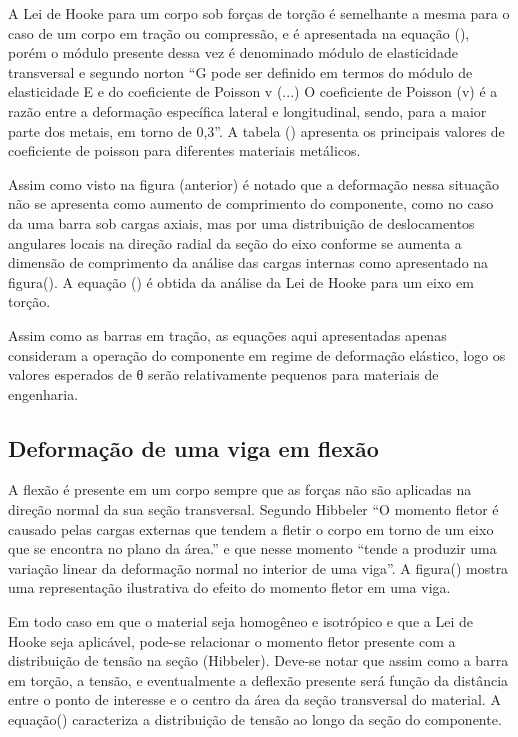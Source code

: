 A Lei de Hooke para um corpo sob forças de torção é semelhante a mesma para o caso de um corpo em tração ou compressão, e é apresentada na equação (), porém o módulo presente dessa vez é denominado módulo de elasticidade transversal e segundo norton “G pode ser definido em termos do módulo de elasticidade E e do coeficiente de Poisson v (...) O coeficiente de Poisson (v) é a razão entre a deformação específica lateral e longitudinal, sendo, para a maior parte dos metais, em torno de 0,3”. A tabela () apresenta os principais valores de coeficiente de poisson para diferentes materiais metálicos.

Assim como visto na figura (anterior) é notado que a deformação nessa situação não se apresenta como aumento de comprimento do componente, como no caso da uma barra sob cargas axiais, mas por uma distribuição de deslocamentos angulares locais na direção radial da seção do eixo conforme se aumenta a dimensão de comprimento da análise das cargas internas como apresentado na figura(). A equação () é obtida da análise da Lei de Hooke para um eixo em torção.

Assim como as barras em tração, as equações aqui apresentadas apenas consideram a operação do componente em regime de deformação elástico, logo os valores esperados de θ serão relativamente pequenos para materiais de engenharia.

\subsection{Deformação de uma viga em flexão}

A flexão é presente em um corpo sempre que as forças não são aplicadas na direção normal da sua seção transversal. Segundo Hibbeler “O momento fletor é causado pelas cargas externas que tendem a fletir o corpo em torno de um eixo que se encontra no plano da área.” e que nesse momento “tende a produzir uma variação linear da deformação normal no interior de uma viga”.  A  figura() mostra uma representação ilustrativa do efeito do momento fletor em uma viga.

Em todo caso em que o material seja homogêneo e isotrópico e que a Lei de Hooke seja aplicável, pode-se relacionar o momento fletor presente com a distribuição de tensão na seção (Hibbeler). Deve-se notar que assim como a barra em torção, a tensão, e eventualmente a deflexão presente será função da distância entre o ponto de interesse e o centro da área da seção transversal do material. A equação() caracteriza a distribuição de tensão ao longo da seção do componente.

